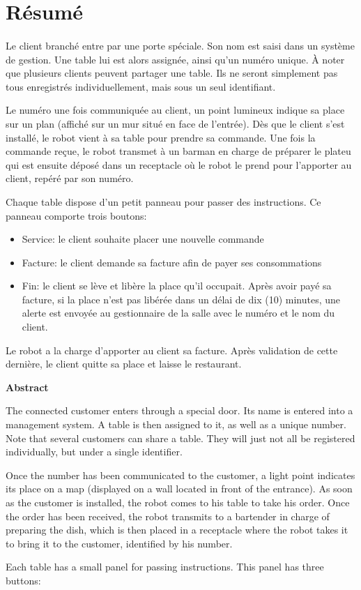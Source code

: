 \section*{Résumé}
\paragraph{}
Le client branché entre par une porte spéciale. Son 
nom est saisi dans un système de gestion. Une table 
lui est alors assignée, ainsi qu'un numéro unique.
À noter que plusieurs clients peuvent partager une 
table. Ils ne seront simplement pas tous enregistrés 
individuellement, mais sous un seul identifiant. \par 
Le numéro une fois communiquée au client, un point 
lumineux indique sa place sur un plan (affiché sur un 
mur situé en face de l'entrée). Dès que le client 
s'est installé, le robot vient à sa table pour prendre
sa commande. Une fois la commande reçue, le robot 
transmet à un barman en charge de préparer le plateu
qui est ensuite déposé dans un receptacle où le robot 
le prend pour l'apporter au client, repéré par son numéro. \par 
Chaque table dispose d'un petit panneau pour passer
des instructions. Ce panneau comporte trois boutons:
\par 
\begin{itemize}
    \item Service: le client souhaite placer une nouvelle commande
    \item Facture: le client demande sa facture afin de payer ses consommations
    \item Fin: le client se lève et libère la place qu'il occupait.
    Après avoir payé sa facture, si la place n'est pas 
    libérée dans un délai de dix (10) minutes, une alerte
    est envoyée au gestionnaire de la salle avec le 
    numéro et le nom du client.
\end{itemize}
\par
Le robot a la charge d'apporter au client sa facture. 
Après validation de cette dernière, le client quitte sa
place et laisse le restaurant.
\par 

\textbf{Abstract}
\par
The connected customer enters through a special door. 
Its name is entered into a management system. A table 
is then assigned to it, as well as a unique number. 
Note that several customers can share a table. They 
will just not all be registered individually, but 
under a single identifier. \par 
Once the number has been communicated to the customer, 
a light point indicates its place on a map (displayed 
on a wall located in front of the entrance). As soon 
as the customer is installed, the robot comes to his 
table to take his order. Once the order has been 
received, the robot transmits to a bartender in charge 
of preparing the dish, which is then placed in a 
receptacle where the robot takes it to bring it to 
the customer, identified by his number. \par 
Each table has a small panel for passing instructions. 
This panel has three buttons:
\par 
